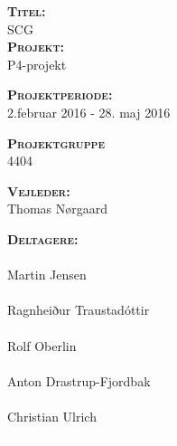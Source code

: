  \begin{minipage}[t]{0.48\textwidth}
 \textsc{\textbf{Titel:}} \\[5pt]\bigskip\hspace{2ex}
SCG\\  


\noindent  \textsc{\textbf{Projekt:}}\\[5pt]\bigskip\hspace{2ex}
P4-projekt

\noindent  \textsc{\textbf{Projektperiode:}} \\[5pt]\bigskip\hspace{2ex}
2.februar 2016 - 28. maj 2016

\noindent  \textsc{\textbf{Projektgruppe}} \\[5pt]\bigskip\hspace{2ex}
4404

\noindent  \textsc{\textbf{Vejleder:}} \\[5pt]\hspace*{2ex}
Thomas Nørgaard \\\bigskip\hspace{2ex}


\noindent  \textsc{\textbf{Deltagere:}} \\[5pt]\hspace*{2ex}
\textcolor{white}{white}\\\hspace*{2ex}
Martin Jensen \\\hspace*{2ex} 
\textcolor{white}{white}\\\hspace*{2ex}
Ragnheiður Traustadóttir\\\hspace*{2ex}
\textcolor{white}{white}\\\hspace*{2ex}
 Rolf Oberlin \\\hspace*{2ex}
\textcolor{white}{white}\\\hspace*{2ex}
Anton Drastrup-Fjordbak \\\hspace*{2ex}
\textcolor{white}{white}\\\hspace*{2ex}
 Christian Ulrich\\\hspace*{2ex}
\textcolor{white}{white}\\\hspace*{2ex}






\vspace*{1cm}

\end{minipage}
